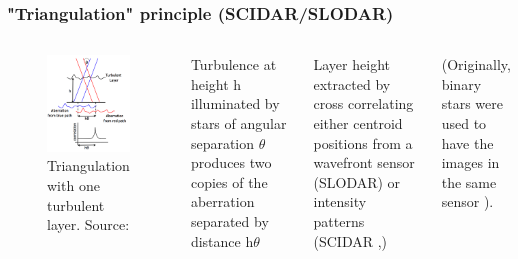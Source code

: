 \documentclass{beamer}
\newenvironment{wideitemize}{\itemize\addtolength{\itemsep}{15pt}}{\enditemize\hspace{\textwidth}}
\begin{document}
{
	\frametitle{"Triangulation" principle (SCIDAR/SLODAR) 
	\cite{osborn2015characterising}}
       \begin{columns}
		\begin{figure}[l]
			\includegraphics[width=1\textwidth]{images/scidar-triangulation.png}
			\caption{Triangulation with one turbulent layer. Source: 
			\cite{osborn2015characterising}}
		\end{figure}
		    \begin{wideitemize}
			    \item Turbulence at height h illuminated by stars of	
			    angular separation $\theta$ produces two copies of the 
			    aberration separated by distance h$\theta$ 
			    \item Layer height extracted by cross correlating 
			    either centroid positions from a wavefront sensor 
			    (SLODAR) or intensity patterns (SCIDAR 
			    \cite{rocca1974detection},\cite{vernin1973experimental}) 
			\end{wideitemize} 
	
			(Originally, binary stars were used to have the images in the same 
			sensor \cite{vernin1973experimental}). 
		\end{columns}
}
\end{document}
